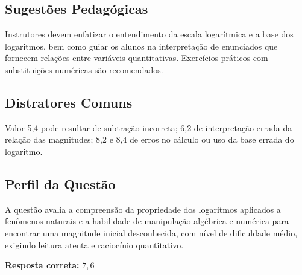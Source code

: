 \documentclass{article}
\begin{document}
\subsection*{Sugestões Pedagógicas}
Instrutores devem enfatizar o entendimento da escala logarítmica e a base dos logaritmos, bem como guiar os alunos na interpretação de enunciados que fornecem relações entre variáveis quantitativas. Exercícios práticos com substituições numéricas são recomendados.

\subsection*{Distratores Comuns}
Valor 5,4 pode resultar de subtração incorreta; 6,2 de interpretação errada da relação das magnitudes; 8,2 e 8,4 de erros no cálculo ou uso da base errada do logaritmo.

\subsection*{Perfil da Questão}
A questão avalia a compreensão da propriedade dos logaritmos aplicados a fenômenos naturais e a habilidade de manipulação algébrica e numérica para encontrar uma magnitude inicial desconhecida, com nível de dificuldade médio, exigindo leitura atenta e raciocínio quantitativo.

\vspace{1em}
\textbf{Resposta correta:} $\boxed{7,6}$
\end{document}
